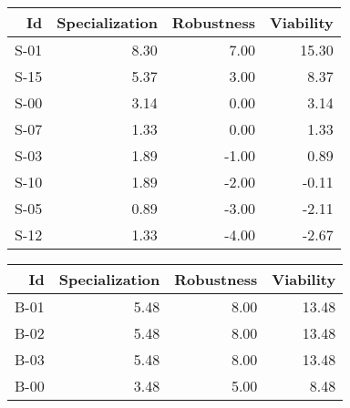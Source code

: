 


\begin{tabular}{ | r | r | r | r | }
    \hline
                    Id  &  Specialization  &      Robustness  &       Viability  \\
    \hline
    \hline
                  S-01  &            8.30  &            7.00  &           15.30  \\
    \hline
                  S-15  &            5.37  &            3.00  &            8.37  \\
    \hline
                  S-00  &            3.14  &            0.00  &            3.14  \\
    \hline
                  S-07  &            1.33  &            0.00  &            1.33  \\
    \hline
                  S-03  &            1.89  &           -1.00  &            0.89  \\
    \hline
                  S-10  &            1.89  &           -2.00  &           -0.11  \\
    \hline
                  S-05  &            0.89  &           -3.00  &           -2.11  \\
    \hline
                  S-12  &            1.33  &           -4.00  &           -2.67  \\
    \hline
\end{tabular}


\begin{tabular}{ | r | r | r | r | }
    \hline
                    Id  &  Specialization  &      Robustness  &       Viability  \\
    \hline
    \hline
                  B-01  &            5.48  &            8.00  &           13.48  \\
    \hline
                  B-02  &            5.48  &            8.00  &           13.48  \\
    \hline
                  B-03  &            5.48  &            8.00  &           13.48  \\
    \hline
                  B-00  &            3.48  &            5.00  &            8.48  \\
    \hline
\end{tabular}


